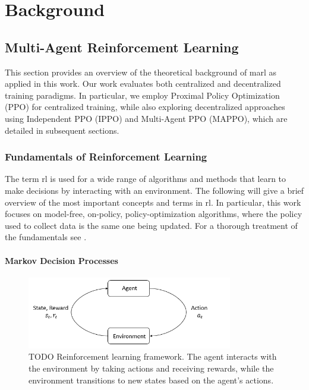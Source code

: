 \chapter{Background}

\section{Multi-Agent Reinforcement Learning}

This section provides an overview of the theoretical background of \gls{marl} as applied in this work. Our work evaluates both centralized and decentralized training paradigms. In particular, we employ Proximal Policy Optimization (PPO) for centralized training, while also exploring decentralized approaches using Independent PPO (IPPO) and Multi-Agent PPO (MAPPO), which are detailed in subsequent sections.

\subsection{Fundamentals of Reinforcement Learning}
The term \gls{rl} is used for a wide range of algorithms and methods that learn to make decisions by interacting with an environment. The following will give a brief overview of the most important concepts and terms in \gls{rl}. In particular, this work focuses on model-free, on-policy, policy-optimization algorithms, where the policy used to collect data is the same one being updated. For a thorough treatment of the fundamentals see \cite{SuttonBarto2018}.
\subsubsection{Markov Decision Processes}
\begin{figure}
\centering
\includegraphics[width=0.8\textwidth]{images/rl_diagram.png}
\caption{TODO   Reinforcement learning framework. The agent interacts with the environment by taking actions and receiving rewards, while the environment transitions to new states based on the agent's actions.}
\label{fig:rl_diagram}
\end{figure}

